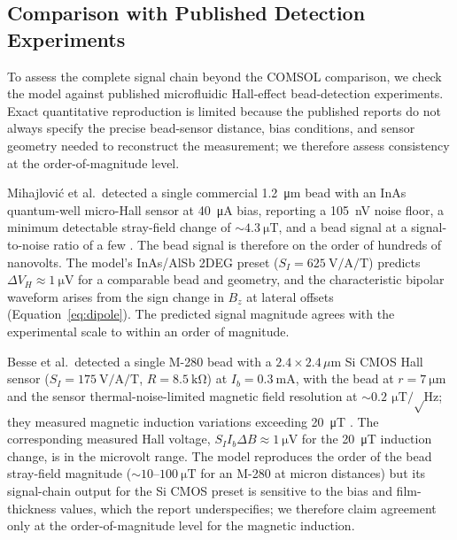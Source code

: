 \documentclass[micromachines,article,submit,pdftex,moreauthors]{Definitions/mdpi}
\begin{document}
\subsection{Comparison with Published Detection Experiments}
\label{sec:expvalidation}

To assess the complete signal chain beyond the COMSOL comparison, we check the model
against published microfluidic Hall-effect bead-detection experiments. Exact
quantitative reproduction is limited because the published reports do not always
specify the precise bead-sensor distance, bias conditions, and sensor geometry needed
to reconstruct the measurement; we therefore assess consistency at the order-of-magnitude
level.

Mihajlovi\'{c} et al.\ detected a single commercial \SI{1.2}{\micro\meter} bead with
an InAs quantum-well micro-Hall sensor at \SI{40}{\micro\ampere} bias, reporting a
\SI{105}{\nano\volt} noise floor, a minimum detectable stray-field change of
${\sim}\SI{4.3}{\micro\tesla}$, and a bead signal at a signal-to-noise ratio of a few
\cite{mihajlovic2005}. The bead signal is therefore on the order of hundreds of
nanovolts. The model's InAs/AlSb 2DEG preset
($S_I = \SI{625}{\volt\per\ampere\per\tesla}$) predicts $\Delta V_H \approx
\SI{1}{\micro\volt}$ for a comparable bead and geometry, and the characteristic
bipolar waveform arises from the sign change in $B_z$ at lateral offsets
(Equation~\eqref{eq:dipole}). The predicted signal magnitude agrees with the
experimental scale to within an order of magnitude.

Besse et al.\ detected a single M-280 bead with a $2.4 \times 2.4$\,$\mu$m Si CMOS
Hall sensor ($S_I = \SI{175}{\volt\per\ampere\per\tesla}$, $R = \SI{8.5}{\kilo\ohm}$)
at $I_b = \SI{0.3}{\milli\ampere}$, with the bead at $r = \SI{7}{\micro\meter}$ and
the sensor thermal-noise-limited magnetic field resolution at
${\sim}\SI{0.2}{\micro\tesla\per\sqrt\hertz}$; they measured magnetic induction
variations exceeding \SI{20}{\micro\tesla} \cite{besse2002}. The corresponding
measured Hall voltage, $S_I I_b \Delta B \approx \SI{1}{\micro\volt}$ for the
\SI{20}{\micro\tesla} induction change, is in the microvolt range. The model
reproduces the order of the bead stray-field magnitude
(${\sim}10$--$\SI{100}{\micro\tesla}$ for an M-280 at micron distances) but its
signal-chain output for the Si CMOS preset is sensitive to the bias and film-thickness
values, which the report underspecifies; we therefore claim agreement only at the
order-of-magnitude level for the magnetic induction.
\end{document}
